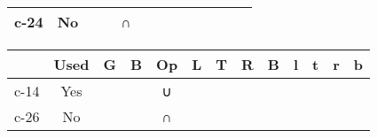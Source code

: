 \begin{tabular}[pos]{ | r | c | c | c | c | c | c | c | c | c | c | c | c | }
{\mktsStyleBold{}c-24} & No & \cjkgGlue{\cjk{}\cjkgGlue{\cnjzr{}}\cjkgGlue{}}\cjkgGlue{} & \cjkgGlue{\cjk{}\cjkgGlue{\cnjzr{}}\cjkgGlue{}}\cjkgGlue{} & {\mktsRsgFb{}∩} & \cjkgGlue{\cjk{}\cjkgGlue{\cnjzr{}}\cjkgGlue{}}\cjkgGlue{} &  & \cjkgGlue{\cjk{}\cjkgGlue{\cnjzr{}}\cjkgGlue{}}\cjkgGlue{} & \cjkgGlue{\cjk{}\cjkgGlue{\cnjzr{}}\cjkgGlue{}}\cjkgGlue{} &  &  &  & \\
\hline
\end{tabular}



\begin{tabular}[pos]{ | r | c | c | c | c | c | c | c | c | c | c | c | c | }
\hline
 & {\mktsStyleBold{}Used} & {\mktsStyleBold{}G} & {\mktsStyleBold{}B} & {\mktsStyleBold{}Op} & {\mktsStyleBold{}L} & {\mktsStyleBold{}T} & {\mktsStyleBold{}R} & {\mktsStyleBold{}B} & {\mktsStyleBold{}l} & {\mktsStyleBold{}t} & {\mktsStyleBold{}r} & {\mktsStyleBold{}b}\\

\hline
{\mktsStyleBold{}c-14} & Yes & \cjkgGlue{\cjk{}\cjkgGlue{\cnjzr{}}\cjkgGlue{}}\cjkgGlue{} & \cjkgGlue{\cjk{}\cjkgGlue{\cnjzr{}}\cjkgGlue{}}\cjkgGlue{} & {\mktsRsgFb{}∪} & \cjkgGlue{\cjk{}\cjkgGlue{\cnjzr{}}\cjkgGlue{}}\cjkgGlue{} & \cjkgGlue{\cjk{}\cjkgGlue{\cnjzr{}}\cjkgGlue{}}\cjkgGlue{} & \cjkgGlue{\cjk{}\cjkgGlue{\cnjzr{}}\cjkgGlue{}}\cjkgGlue{} & \cjkgGlue{\cjk{}\cjkgGlue{\cnjzr{}}\cjkgGlue{}}\cjkgGlue{} &  &  &  & \\
{\mktsStyleBold{}c-26} & No & \cjkgGlue{\cjk{}\cjkgGlue{\cnjzr{}}\cjkgGlue{}}\cjkgGlue{} & \cjkgGlue{\cjk{}\cjkgGlue{\cnjzr{}}\cjkgGlue{}}\cjkgGlue{} & {\mktsRsgFb{}∩} & \cjkgGlue{\cjk{}\cjkgGlue{\cnjzr{}}\cjkgGlue{}}\cjkgGlue{} & \cjkgGlue{\cjk{}\cjkgGlue{\cnjzr{}}\cjkgGlue{}}\cjkgGlue{} & \cjkgGlue{\cjk{}\cjkgGlue{\cnjzr{}}\cjkgGlue{}}\cjkgGlue{} & \cjkgGlue{\cjk{}\cjkgGlue{\cnjzr{}}\cjkgGlue{}}\cjkgGlue{} &  &  &  & \\
\hline
\end{tabular}



\vspace{\myLineheight}\begin{multicols}{2}\raggedcolumns{}

\end{multicols}





